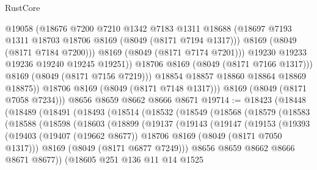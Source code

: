 \begin{lexlean}{RustCore}
\begin{coremodule}
                      @19058
                      (@18676
                        @7200
                        @7210
                        @1342
                        @7183
                        @1311
                        @18688
                        (@18697 @7193 @1311 @18703 @18706 @8169 (@8049 (@8171 @7194 @1317)))
                        @8169
                        (@8049 (@8171 @7184 @7200)))
                      @8169
                      (@8049 (@8171 @7174 @7201)))
                    @19230
                    @19233
                    @19236
                    @19240
                    @19245
                    @19251))
                @18706
                @8169
                (@8049 (@8171 @7166 @1317)))
              @8169
              (@8049 (@8171 @7156 @7219)))
            @18854
            @18857
            @18860
            @18864
            @18869
            @18875))
        @18706
        @8169
        (@8049 (@8171 @7148 @1317)))
      @8169
      (@8049 (@8171 @7058 @7234)))
    @8656
    @8659
    @8662
    @8666
    @8671
@19714 := @18423
    (@18448
      (@18489
        (@18491
          (@18493
            (@18514
              (@18532
                (@18549
                  (@18568
                    (@18579
                      (@18583
                        (@18588
                          (@18598
                            (@18603
                              (@18899
                                (@19137
                                  (@19143
                                    (@19147
                                      (@19153
                                        (@19393
                                          (@19403
                                            (@19407 (@19662 @8677))
                                            @18706
                                            @8169
                                            (@8049 (@8171 @7050 @1317)))
                                          @8169
                                          (@8049 (@8171 @6877 @7249)))
                                        @8656
                                        @8659
                                        @8662
                                        @8666
                                        @8671
                                        @8677))
                                    (@18605
                                      @251
                                      @136
                                      @11
                                      @14
                                      @1525

\end{coremodule}
\end{lexlean}
